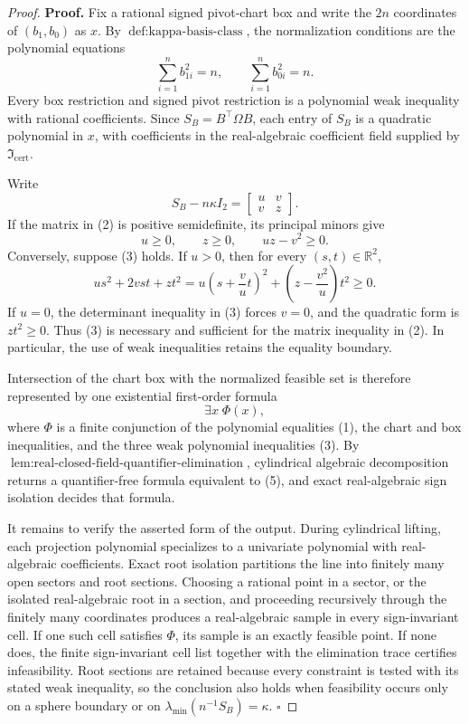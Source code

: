 \documentclass{article}
\begin{document}
\begin{proof}
\textbf{Proof.}
Fix a rational signed pivot-chart box and write the \(2n\) coordinates of \((b_1,b_0)\) as \(x\).  By \(\operatorname{def{:}kappa\mbox{-}basis\mbox{-}class}\), the normalization conditions are the polynomial equations
\[
\sum_{i=1}^n b_{1i}^2=n,
\qquad
\sum_{i=1}^n b_{0i}^2=n.
\tag{1}
\]
Every box restriction and signed pivot restriction is a polynomial weak inequality with rational coefficients.  Since \(S_B=B^{\top}\Omega B\), each entry of \(S_B\) is a quadratic polynomial in \(x\), with coefficients in the real-algebraic coefficient field supplied by \(\mathfrak I_{\mathrm{cert}}\).

Write
\[
S_B-n\kappa I_2=
\begin{bmatrix}u&v\\v&z\end{bmatrix}.
\tag{2}
\]
If the matrix in (2) is positive semidefinite, its principal minors give
\[
u\ge0,
\qquad z\ge0,
\qquad uz-v^2\ge0.
\tag{3}
\]
Conversely, suppose (3) holds.  If \(u>0\), then for every \((s,t)\in\mathbb R^2\),
\[
us^2+2vst+zt^2
=u\left(s+\frac vu t\right)^2
+\left(z-\frac{v^2}{u}\right)t^2\ge0.
\tag{4}
\]
If \(u=0\), the determinant inequality in (3) forces \(v=0\), and the quadratic form is \(zt^2\ge0\).  Thus (3) is necessary and sufficient for the matrix inequality in (2).  In particular, the use of weak inequalities retains the equality boundary.

Intersection of the chart box with the normalized feasible set is therefore represented by one existential first-order formula
\[
\exists x\;\Phi(x),
\tag{5}
\]
where \(\Phi\) is a finite conjunction of the polynomial equalities (1), the chart and box inequalities, and the three weak polynomial inequalities (3).  By \(\operatorname{lem{:}real\mbox{-}closed\mbox{-}field\mbox{-}quantifier\mbox{-}elimination}\), cylindrical algebraic decomposition returns a quantifier-free formula equivalent to (5), and exact real-algebraic sign isolation decides that formula.

It remains to verify the asserted form of the output.  During cylindrical lifting, each projection polynomial specializes to a univariate polynomial with real-algebraic coefficients.  Exact root isolation partitions the line into finitely many open sectors and root sections.  Choosing a rational point in a sector, or the isolated real-algebraic root in a section, and proceeding recursively through the finitely many coordinates produces a real-algebraic sample in every sign-invariant cell.  If one such cell satisfies \(\Phi\), its sample is an exactly feasible point.  If none does, the finite sign-invariant cell list together with the elimination trace certifies infeasibility.  Root sections are retained because every constraint is tested with its stated weak inequality, so the conclusion also holds when feasibility occurs only on a sphere boundary or on \(\lambda_{\min}(n^{-1}S_B)=\kappa\). \(\square\)
\end{proof}
\end{document}

